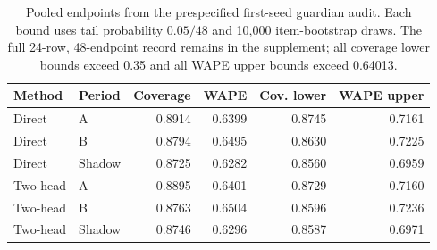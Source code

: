 \begin{table}[htbp]
\centering\small
\caption{Pooled endpoints from the prespecified first-seed guardian audit. Each bound uses tail probability $0.05/48$ and 10,000 item-bootstrap draws. The full 24-row, 48-endpoint record remains in the supplement; all coverage lower bounds exceed 0.35 and all WAPE upper bounds exceed 0.64013.}
\label{tab:m5guardianbounds}
\begin{tabular}{llrrrr}\toprule
Method & Period & Coverage & WAPE & Cov. lower & WAPE upper\\\midrule
Direct & A & 0.8914 & 0.6399 & 0.8745 & 0.7161\\
Direct & B & 0.8794 & 0.6495 & 0.8630 & 0.7225\\
Direct & Shadow & 0.8725 & 0.6282 & 0.8560 & 0.6959\\
Two-head & A & 0.8895 & 0.6401 & 0.8729 & 0.7160\\
Two-head & B & 0.8763 & 0.6504 & 0.8596 & 0.7236\\
Two-head & Shadow & 0.8746 & 0.6296 & 0.8587 & 0.6971\\
\bottomrule\end{tabular}
\end{table}
